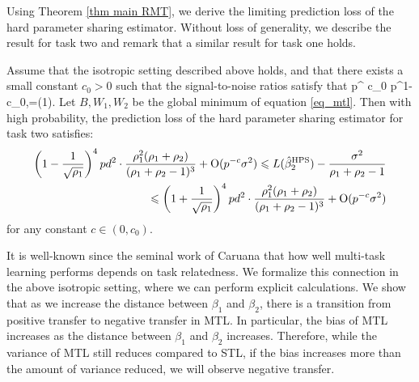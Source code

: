 Using Theorem \ref{thm main RMT}, %
we derive the limiting prediction loss of the hard parameter sharing estimator.
Without loss of generality, we describe the result for task two and remark that a similar result for task one holds.

\begin{corollary}
	Assume that the isotropic setting described above holds, and that there exists a small constant $c_0>0$ such that the signal-to-noise ratios satisfy that
\be\label{choiceofpara0}
p^{ c_0} \le {}  \le p^{1-c_0},\quad  {}=\OO(1).
\ee
	Let $B, W_1, W_2$ be the global minimum of equation \eqref{eq_mtl}. Then with high probability, the prediction loss of the hard parameter sharing estimator for task two satisfies:
	\begin{align*}
	 \left( 1-\frac{1}{\sqrt{\rho_1}}\right)^4 pd^2\cdot \frac{\rho_1^2 (\rho_1+\rho_2)}{(\rho_1 + \rho_2 - 1)^3} +\operatorname{O}(p^{-c}\sigma^2)  \leqslant L(\hat{\beta}_2^{\textup{HPS}}) -\frac{\sigma^2}{\rho_1+\rho_2-1} \\
	 \leqslant  \left( 1+\frac{1}{\sqrt{\rho_1}}\right)^4 pd^2\cdot \frac{\rho_1^2 (\rho_1+\rho_2)}{(\rho_1 + \rho_2 - 1)^3} +\operatorname{O}(p^{-c}\sigma^2 )
	 \end{align*}
	 for any constant $c\in (0,c_0)$.

\end{corollary}


It is well-known since the seminal work of Caruana \cite{C97} that how well multi-task learning performs depends on task relatedness.
We formalize this connection in the above isotropic setting, where we can perform explicit calculations.
We show that as we increase the distance between $\beta_1$ and $\beta_2$, there is a transition from positive transfer to negative transfer in MTL.
In particular, the bias of MTL increases as the distance between $\beta_1$ and $\beta_2$ increases.
Therefore, while the variance of MTL still reduces compared to STL, if the bias increases more than the amount of variance reduced, we will observe negative transfer.



